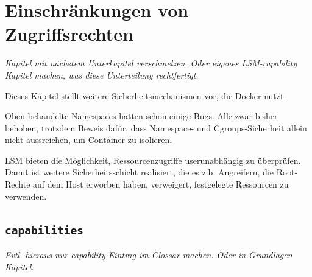 \documentclass[../main.tex]{subfiles}
\begin{document}







  \section{Einschränkungen von Zugriffsrechten}
		\emph{Kapitel mit nächstem Unterkapitel verschmelzen. Oder eigenes LSM-capability Kapitel machen, was diese Unterteilung rechtfertigt.}

		Dieses Kapitel stellt weitere Sicherheitsmechanismen vor, die Docker nutzt.

		Oben behandelte Namespaces hatten schon einige Bugs. Alle zwar bisher behoben, trotzdem Beweis dafür, dass Namespace- und Cgroups-Sicherheit allein nicht aussreichen, um Container zu isolieren.

		LSM bieten die Möglichkeit, Ressourcenzugriffe userunabhängig zu überprüfen. Damit ist weitere Sicherheitsschicht realisiert, die es z.b. Angreifern, die Root-Rechte auf dem Host erworben haben, verweigert, festgelegte Ressourcen zu verwenden.
    \subsection{\texttt{capabilities}}

			\emph{Evtl. hieraus nur capability-Eintrag im Glossar machen. Oder in Grundlagen Kapitel.}
\end{document}
